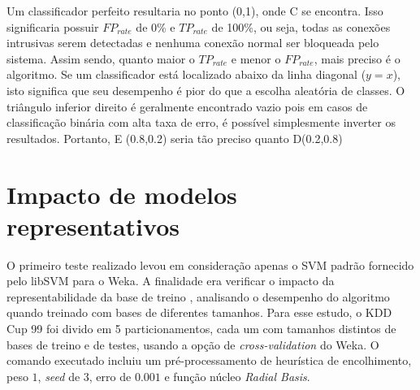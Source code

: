 \par Um classificador perfeito resultaria no ponto (0,1), onde C se encontra. Isso significaria possuir $FP_{rate}$ de
0\% e $TP_{rate}$ de 100\%, ou seja, todas as conexões intrusivas serem detectadas e nenhuma conexão normal ser
bloqueada pelo sistema. Assim sendo, quanto maior o $TP_{rate}$ e menor o $FP_{rate}$, mais preciso é o algoritmo.
 Se um classificador está localizado abaixo da linha diagonal ($y = x$), isto significa que seu desempenho é pior do
 que a escolha aleatória de classes. O triângulo inferior direito é geralmente encontrado vazio pois em casos de
 classificação binária com alta taxa de erro, é possível simplesmente inverter os resultados. Portanto, E (0.8,0.2)
 seria tão preciso quanto D(0.2,0.8)


\section{Impacto de modelos representativos}
O primeiro teste realizado levou em consideração apenas o SVM padrão fornecido pelo libSVM para o Weka. A finalidade
era verificar o impacto da representabilidade da base de treino \cite{yaman11}, analisando o desempenho do algoritmo
quando treinado com bases de diferentes tamanhos. Para esse estudo, o KDD Cup 99 foi divido em 5 particionamentos,
cada um com tamanhos distintos de bases de treino e de testes, usando a opção de \textit{cross-validation} do Weka.
O comando executado incluiu um pré-processamento de heurística de encolhimento, peso $1$, \emph{seed} de $3$, erro de
$0.001$ e função núcleo \textit{Radial Basis}.

